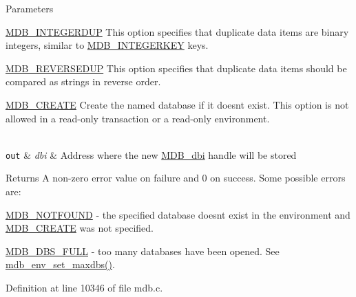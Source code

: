 \begin{DoxyParams}[1]{Parameters}
\begin{DoxyItemize}
\item \mbox{\hyperlink{group__mdb__dbi__open_gad9b1b4e231bf2e4fa8d7f90be8ba2765}{M\+D\+B\+\_\+\+I\+N\+T\+E\+G\+E\+R\+D\+UP}} This option specifies that duplicate data items are binary integers, similar to \mbox{\hyperlink{group__mdb__dbi__open_ga219c5c50d41902fca79c68d8836e7753}{M\+D\+B\+\_\+\+I\+N\+T\+E\+G\+E\+R\+K\+EY}} keys. 
\item \mbox{\hyperlink{group__mdb__dbi__open_gaf99ce592b75d65e23503f78a7933c297}{M\+D\+B\+\_\+\+R\+E\+V\+E\+R\+S\+E\+D\+UP}} This option specifies that duplicate data items should be compared as strings in reverse order. 
\item \mbox{\hyperlink{group__mdb__dbi__open_gafd47620cff55fb3ec7cd7501d4d1cb4a}{M\+D\+B\+\_\+\+C\+R\+E\+A\+TE}} Create the named database if it doesn\textquotesingle{}t exist. This option is not allowed in a read-\/only transaction or a read-\/only environment. 
\end{DoxyItemize}\\
\hline
\mbox{\tt out}  & {\em dbi} & Address where the new \mbox{\hyperlink{group__mdb_gadbe68a06c448dfb62da16443d251a78b}{M\+D\+B\+\_\+dbi}} handle will be stored \\
\hline
\end{DoxyParams}
\begin{DoxyReturn}{Returns}
A non-\/zero error value on failure and 0 on success. Some possible errors are\+: 
\begin{DoxyItemize}
\item \mbox{\hyperlink{group__errors_gabeb52e4c4be21b329e31c4add1b71926}{M\+D\+B\+\_\+\+N\+O\+T\+F\+O\+U\+ND}} -\/ the specified database doesn\textquotesingle{}t exist in the environment and \mbox{\hyperlink{group__mdb__dbi__open_gafd47620cff55fb3ec7cd7501d4d1cb4a}{M\+D\+B\+\_\+\+C\+R\+E\+A\+TE}} was not specified. 
\item \mbox{\hyperlink{group__errors_ga6288de36b58badda2e5a64ecddd1da70}{M\+D\+B\+\_\+\+D\+B\+S\+\_\+\+F\+U\+LL}} -\/ too many databases have been opened. See \mbox{\hyperlink{group__mdb_gaa2fc2f1f37cb1115e733b62cab2fcdbc}{mdb\+\_\+env\+\_\+set\+\_\+maxdbs()}}. 
\end{DoxyItemize}
\end{DoxyReturn}


Definition at line 10346 of file mdb.\+c.

\mbox{\label{group__internal_gac61d3087282b0824c8c5caff6caabdf3}} 
